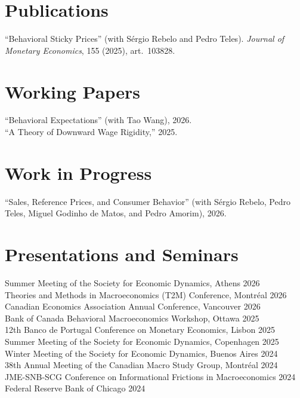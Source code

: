 \documentclass[11pt]{article}
\begin{document}
\section{Publications}
\noindent
``Behavioral Sticky Prices'' (with Sérgio Rebelo and Pedro Teles). \textit{Journal of Monetary Economics}, 155 (2025), art.\ 103828.

\section{Working Papers}
\noindent
``Behavioral Expectations'' (with Tao Wang), 2026. \\[4pt]
``A Theory of Downward Wage Rigidity,'' 2025.

\section{Work in Progress}
\noindent
``Sales, Reference Prices, and Consumer Behavior'' (with Sérgio Rebelo, Pedro Teles, Miguel Godinho de Matos, and Pedro Amorim), 2026.

\section{Presentations and Seminars}
\noindent
Summer Meeting of the Society for Economic Dynamics, Athens \hfill 2026 \\
Theories and Methods in Macroeconomics (T2M) Conference, Montréal \hfill 2026 \\
Canadian Economics Association Annual Conference, Vancouver \hfill 2026 \\
Bank of Canada Behavioral Macroeconomics Workshop, Ottawa \hfill 2025 \\
12th Banco de Portugal Conference on Monetary Economics, Lisbon \hfill 2025 \\
Summer Meeting of the Society for Economic Dynamics, Copenhagen \hfill 2025 \\
Winter Meeting of the Society for Economic Dynamics, Buenos Aires \hfill 2024 \\
38th Annual Meeting of the Canadian Macro Study Group, Montréal \hfill 2024 \\
JME-SNB-SCG Conference on Informational Frictions in Macroeconomics \hfill 2024 \\
Federal Reserve Bank of Chicago \hfill 2024
\end{document}
